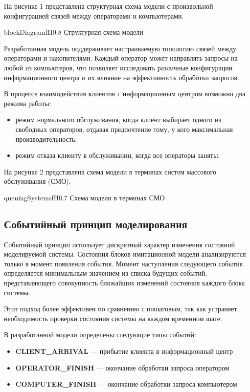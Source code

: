 На рисунке 1 представлена структурная схема модели с произвольной конфигурацией связей между операторами и компьютерами.

	{blockDiagram}{f}{H}{0.8\textwidth}
	{Структурная схема модели}

Разработанная модель поддерживает настраиваемую топологию связей между операторами и накопителями. Каждый оператор может направлять запросы на любой из компьютеров, что позволяет исследовать различные конфигурации информационного центра и их влияние на эффективность обработки запросов.

В процессе взаимодействия клиентов с информационным центром возможно два режима работы:

\begin{itemize}
    \item режим нормального обслуживания, когда клиент выбирает одного из свободных операторов, отдавая предпочтение тому, у кого максимальная производительность;
    \item режим отказа клиенту в обслуживании, когда все операторы заняты.
\end{itemize}

На рисунке 2 представлена схема модели в терминах систем массового обслуживания (СМО).

	{queuingSystems}{f}{H}{0.7\textwidth}
	{Схема модели в терминах СМО}

\subsection{Событийный принцип моделирования}

Событийный принцип использует дискретный характер изменения состояний моделируемой системы. Состояния блоков имитационной модели анализируются только в момент появления события. Момент наступления следующего события определяется минимальным значением из списка будущих событий, представляющего совокупность ближайших изменений состояния каждого блока системы.

Этот подход более эффективен по сравнению с пошаговым, так как устраняет необходимость проверки состояния системы на каждом временном шаге.

В разработанной модели определены следующие типы событий:

\begin{itemize}
    \item \textbf{CLIENT\_ARRIVAL} — прибытие клиента в информационный центр
    \item \textbf{OPERATOR\_FINISH} — окончание обработки запроса оператором
    \item \textbf{COMPUTER\_FINISH} — окончание обработки запроса компьютером
\end{itemize}

